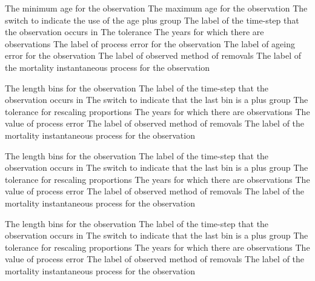 \par\textbf{}\par
{} {The minimum age for the observation}
 {The maximum age for the observation}
 {The switch to indicate the use of the age plus group}
 {The label of the time-step that the observation occurs in}
 {The tolerance}
 {The years for which there are observations}
 {The label of process error for the observation}
 {The label of ageing error for the observation}
 {The label of observed method of removals}
 {The label of the mortality instantaneous process for the observation}

\par\textbf{}\par
{} {The length bins for the observation}
 {The label of the time-step that the observation occurs in}
 {The switch to indicate that the last bin is a plus group}
 {The tolerance for rescaling proportions}
 {The years for which there are observations}
 {The value of process error}
 {The label of observed method of removals}
 {The label of the mortality instantaneous process for the observation}

\par\textbf{}\par
{} {The length bins for the observation}
 {The label of the time-step that the observation occurs in}
 {The switch to indicate that the last bin is a plus group}
 {The tolerance for rescaling proportions}
 {The years for which there are observations}
 {The value of process error}
 {The label of observed method of removals}
 {The label of the mortality instantaneous process for the observation}

\par\textbf{}\par
{} {The length bins for the observation}
 {The label of the time-step that the observation occurs in}
 {The switch to indicate that the last bin is a plus group}
 {The tolerance for rescaling proportions}
 {The years for which there are observations}
 {The value of process error}
 {The label of observed method of removals}
 {The label of the mortality instantaneous process for the observation}

